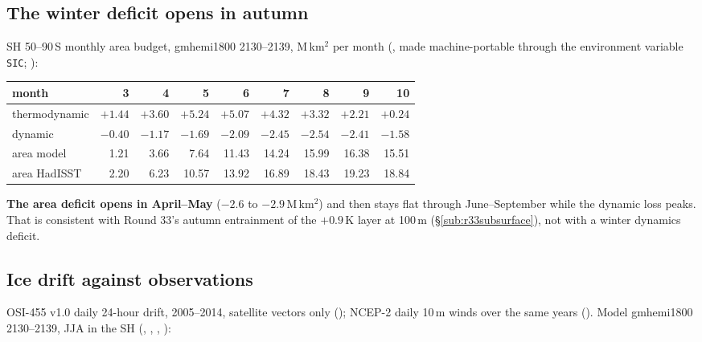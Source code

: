 \documentclass[10pt]{article}
\begin{document}
\subsection{The winter deficit opens in autumn}\label{sub:r45budget}

SH 50--90\,S monthly area budget, gmhemi1800 2130--2139, M\,km$^2$ per month
(, made machine-portable through the
environment variable \texttt{SIC};
):

\begin{center}\small
\begin{tabular}{lrrrrrrrr}
\toprule
month & 3 & 4 & 5 & 6 & 7 & 8 & 9 & 10 \\
\midrule
thermodynamic & $+1.44$ & $+3.60$ & $+5.24$ & $+5.07$ & $+4.32$ & $+3.32$ & $+2.21$ & $+0.24$ \\
dynamic       & $-0.40$ & $-1.17$ & $-1.69$ & $-2.09$ & $-2.45$ & $-2.54$ & $-2.41$ & $-1.58$ \\
area model    & 1.21 & 3.66 & 7.64 & 11.43 & 14.24 & 15.99 & 16.38 & 15.51 \\
area HadISST  & 2.20 & 6.23 & 10.57 & 13.92 & 16.89 & 18.43 & 19.23 & 18.84 \\
\bottomrule
\end{tabular}
\end{center}

\textbf{The area deficit opens in April--May} ($-2.6$ to $-2.9$\,M\,km$^2$) and then stays flat
through June--September while the dynamic loss peaks. That is consistent with Round 33's autumn
entrainment of the $+0.9$\,K layer at 100\,m (\S\ref{sub:r33subsurface}), not with a winter
dynamics deficit.

\subsection{Ice drift against observations}\label{sub:r45drift}

OSI-455 v1.0 daily 24-hour drift, 2005--2014, satellite vectors only
(); NCEP-2 daily 10\,m winds over the same years
(). Model gmhemi1800 2130--2139, JJA in the
SH (, ,
, ):
\end{document}

